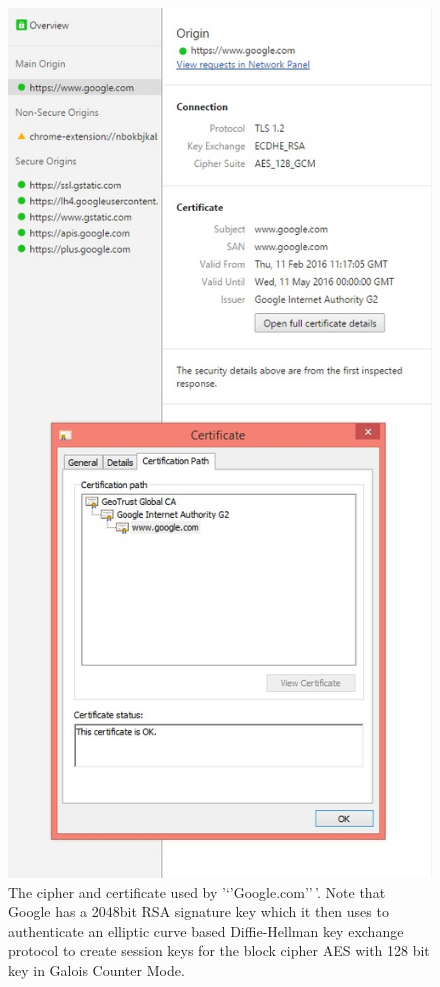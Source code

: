 \begin{figure}
\centering
\includegraphics[width=\textwidth, height=0.25\paperheight, keepaspectratio]{../figure/googletls.jpg}
\caption{The cipher and certificate used by '`'Google.com''\,'. Note
that Google has a 2048bit RSA signature key which it then uses to
authenticate an elliptic curve based Diffie-Hellman key exchange
protocol to create session keys for the block cipher AES with 128 bit
key in Galois Counter Mode.}
\label{tmplabelfig}
\end{figure}

